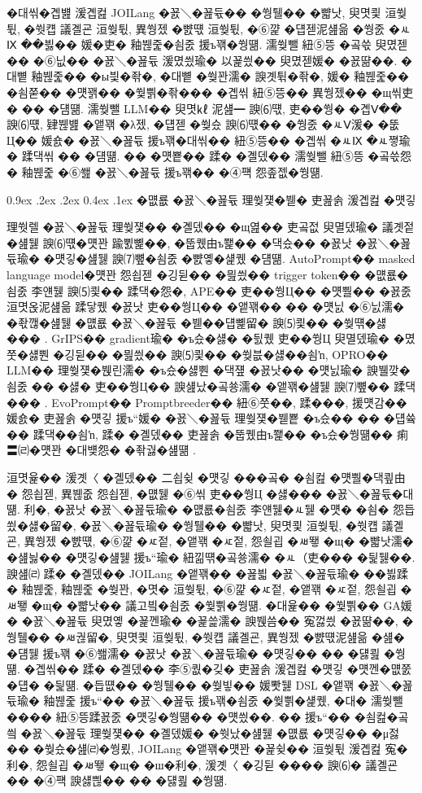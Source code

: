 \documentclass[10pt,twocolumn]{article}
\makeatletter
\renewcommand{\subsection}{\@startsection{subsection}{2}{\z@}%
{0.9ex \@plus .2ex \@minus .2ex}%
{0.4ex \@plus .1ex}%
{\normalfont\normalsize\bfseries}}
\makeatother
\begin{document}
�대씪�곕뱶 湲곕컲 JOILang �꾨＼�꾪듃�� �쒕퉬�� �뺣낫, 臾몃쾿 洹쒖튃, �쒓컙 議곌굔 洹쒖튃, 異쒕젰 �뺤떇 洹쒖튃, �⑥꺑 �덉젣泥섎읆 �쒕줈 �ㅻⅨ ��븷�� 媛�吏� 釉붾줉�쇰줈 援ъ꽦�쒕떎. 濡쒖뺄 紐⑤뜽 �곸쓳 臾몄젣�� �⑥닚�� �꾨＼�꾪듃 湲몄씠瑜� 以꾩씠�� 臾몄젣媛� �꾨땲��. �대뼡 釉붾줉�� �ы븿�좎�, �대뼡 �쒖꽌濡� 諛곗튂�좎�, 媛� 釉붾줉�� �쇰쭏�� �먯꽭�� �쒗쁽�좎��� �곕씪 紐⑤뜽�� 異쒕젰�� �щ씪吏� �� �덈떎. 濡쒖뺄 LLM�� 臾몃㎘ 泥섎━ 諛⑹떇, 吏��쒕� �곕Ⅴ�� 諛⑹떇, 肄붾뱶 �앹꽦 �λ젰, �덉젣 �쒖슜 諛⑹떇�� �쒕줈 �ㅻⅤ湲� �뚮Ц�� 媛숈� �꾨＼�꾪듃 援ъ꽦�대씪�� 紐⑤뜽�� �곕씪 �ㅻⅨ �ㅻ쪟瑜� 蹂댁씪 �� �덈떎. �� �먯뿉�� 蹂� �곌뎄�� 濡쒖뺄 紐⑤뜽 �곸쓳怨� 釉붾줉 �⑥쐞 �꾨＼�꾪듃 援ъ꽦�� �④퍡 怨좊젮�쒕떎.

\subsection{�먮룞 �꾨＼�꾪듃 理쒖쟻�붿� 吏꾪솕 湲곕컲 �먯깋}

理쒓렐 �꾨＼�꾪듃 理쒖쟻�� �곌뎄�� �щ엺�� 吏곸젒 臾멸뎄瑜� 議곗젙�섎뒗 諛⑹떇�먯꽌 踰쀬뼱��, �뚭퀬由ъ쬁�� �댁슜�� �꾨낫 �꾨＼�꾪듃瑜� �먯깋�섎뒗 諛⑺뼢�쇰줈 �뺤옣�섍퀬 �덈떎. AutoPrompt�� masked language model�먯꽌 怨쇱젣 �깅뒫�� �믪씠�� trigger token�� �먮룞�쇰줈 李얜뒗 諛⑸쾿�� 蹂댁�怨�, APE�� 吏��쒕Ц�� �먯뿰�� �꾨줈洹몃옩泥섎읆 蹂닿퀬 �꾨낫 吏��쒕Ц�� �앹꽦�� �� �먯닔 �⑥닔濡� �좏깮�섎뒗 �먮룞 �꾨＼�꾪듃 �붿��덉뼱留� 諛⑸쾿�� �쒖떆�섏��� \cite{REF_AUTOPROMPT,REF_APE}. GrIPS�� gradient瑜� �ъ슜�섏� �딄퀬 吏��쒕Ц 臾멸뎄瑜� �몄쭛�섏뿬 �깅뒫�� �믪씠�� 諛⑸쾿�� �쒖븞�섏��쇰ŉ, OPRO�� LLM�� 理쒖쟻�붽린濡� �ъ슜�섏뿬 �댁쟾 �꾨낫�� �먯닔瑜� 諛뷀깢�쇰줈 �� �섏� 吏��쒕Ц�� 諛섎났�곸쑝濡� �앹꽦�섎뒗 諛⑺뼢�� 蹂댁��� \cite{REF_GRIPS,REF_OPRO}. EvoPrompt�� Promptbreeder�� 紐⑥쭛��, 蹂���, 援먯감�� 媛숈� 吏꾪솕 �먯깋 援ъ“媛� �꾨＼�꾪듃 理쒖쟻�붿뿉 �ъ슜�� �� �덉쓬�� 蹂댁��쇰ŉ, 蹂� �곌뎄�� 吏꾪솕 �뚭퀬由ъ쬁�� �ъ슜�쒕떎�� 痢〓㈃�먯꽌 �대뱾怨� �좎궗�섎떎 \cite{REF_EVOPROMPT,REF_PROMPTBREEDER}.

洹몃윭�� 湲곗〈 �곌뎄�� 二쇱슂 �먯깋 ���곸� �쇰컲 �먯뿰�댁쿂由� 怨쇱젣, 異붾줎 怨쇱젣, �먮뒗 �⑥씪 吏��쒕Ц �섏��� �꾨＼�꾪듃�대떎. 利�, �꾨낫 �꾨＼�꾪듃瑜� �먮룞�쇰줈 李얜뒗�ㅻ뒗 �먯� �쇰� 怨듭쑀�섏�留�, �꾨＼�꾪듃瑜� �쒕퉬�� �뺣낫, 臾몃쾿 洹쒖튃, �쒓컙 議곌굔, 異쒕젰 �뺤떇, �⑥꺑 �ㅼ젙, �앹꽦 �ㅼ젙, 怨쇨굅 �ㅽ뙣 �щ� �뺣낫濡� �섎늻�� �먯깋�섎뒗 援ъ“瑜� 紐낆떆�곸쑝濡� �ㅻ（吏��� �딅뒗��. 諛섎㈃ 蹂� �곌뎄�� JOILang �앹꽦�� �꾪븳 �꾨＼�꾪듃瑜� ��븷蹂� 釉붾줉, 釉붾줉 �쒖꽌, �몃� 洹쒖튃, �⑥꺑 �ㅼ젙, �앹꽦 �ㅼ젙, 怨쇨굅 �ㅽ뙣 �щ� �뺣낫�� 議고빀�쇰줈 �쒗쁽�쒕떎. �대윭�� �쒗쁽�� GA媛� �꾨＼�꾪듃 臾몄옣 �꾩껜瑜� �꾩쓽濡� 諛붽씀�� 寃껋씠 �꾨땲��, �쒕퉬�� �ㅽ궎留�, 臾몃쾿 洹쒖튃, �쒓컙 議곌굔, 異쒕젰 �뺤떇泥섎읆 �섎� �덈뒗 援ъ꽦 �⑥쐞濡� �꾨낫 �꾨＼�꾪듃瑜� �먯깋�� �� �덇쾶 �쒕떎. �곕씪�� 蹂� �곌뎄�� 李⑤퀎�깆� 吏꾪솕 湲곕컲 �먯깋 �먯껜�먮쭔 �덉� �딅떎. �듭떖�� �쒕퉬�� �쒖빟�� 媛뽯뒗 DSL �앹꽦 �꾨＼�꾪듃瑜� 釉붾줉 援ъ“�� �꾨＼�꾪듃 援ъ꽦�쇰줈 �쒗쁽�섍퀬, �대� 濡쒖뺄 ���� 紐⑤뜽蹂꾨줈 �먯깋�쒕떎�� �먯씠��. �� 援ъ“�� �쇰컲�곸씤 �꾨＼�꾪듃 理쒖쟻�� �곌뎄媛� �쒓났�섎뒗 �먮룞 �먯깋�� �μ젏�� �쒖슜�섎㈃�쒕룄, JOILang �앹꽦�먯꽌 �꾩슂�� 洹쒖튃 湲곕컲 寃�利�, 怨쇨굅 �ㅽ뙣 �щ� �ш�利�, 湲곗〈 �깅뒫 ���� 諛⑹� 議곌굔�� �④퍡 諛섏쁺�� �� �덇쾶 �쒕떎.
\end{document}
